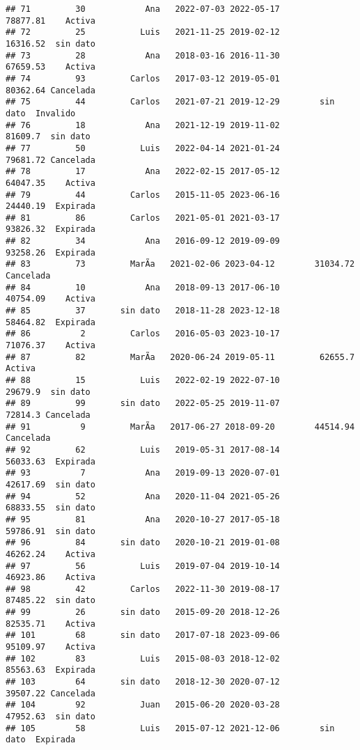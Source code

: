 \documentclass[
]{article}
\begin{document}
\begin{verbatim}
## 71         30            Ana   2022-07-03 2022-05-17        78877.81    Activa
## 72         25           Luis   2021-11-25 2019-02-12        16316.52  sin dato
## 73         28            Ana   2018-03-16 2016-11-30        67659.53    Activa
## 74         93         Carlos   2017-03-12 2019-05-01        80362.64 Cancelada
## 75         44         Carlos   2021-07-21 2019-12-29        sin dato  Invalido
## 76         18            Ana   2021-12-19 2019-11-02         81609.7  sin dato
## 77         50           Luis   2022-04-14 2021-01-24        79681.72 Cancelada
## 78         17            Ana   2022-02-15 2017-05-12        64047.35    Activa
## 79         44         Carlos   2015-11-05 2023-06-16        24440.19  Expirada
## 81         86         Carlos   2021-05-01 2021-03-17        93826.32  Expirada
## 82         34            Ana   2016-09-12 2019-09-09        93258.26  Expirada
## 83         73         MarÃ­a   2021-02-06 2023-04-12        31034.72 Cancelada
## 84         10            Ana   2018-09-13 2017-06-10        40754.09    Activa
## 85         37       sin dato   2018-11-28 2023-12-18        58464.82  Expirada
## 86          2         Carlos   2016-05-03 2023-10-17        71076.37    Activa
## 87         82         MarÃ­a   2020-06-24 2019-05-11         62655.7    Activa
## 88         15           Luis   2022-02-19 2022-07-10         29679.9  sin dato
## 89         99       sin dato   2022-05-25 2019-11-07         72814.3 Cancelada
## 91          9         MarÃ­a   2017-06-27 2018-09-20        44514.94 Cancelada
## 92         62           Luis   2019-05-31 2017-08-14        56033.63  Expirada
## 93          7            Ana   2019-09-13 2020-07-01        42617.69  sin dato
## 94         52            Ana   2020-11-04 2021-05-26        68833.55  sin dato
## 95         81            Ana   2020-10-27 2017-05-18        59786.91  sin dato
## 96         84       sin dato   2020-10-21 2019-01-08        46262.24    Activa
## 97         56           Luis   2019-07-04 2019-10-14        46923.86    Activa
## 98         42         Carlos   2022-11-30 2019-08-17        87485.22  sin dato
## 99         26       sin dato   2015-09-20 2018-12-26        82535.71    Activa
## 101        68       sin dato   2017-07-18 2023-09-06        95109.97    Activa
## 102        83           Luis   2015-08-03 2018-12-02        85563.63  Expirada
## 103        64       sin dato   2018-12-30 2020-07-12        39507.22 Cancelada
## 104        92           Juan   2015-06-20 2020-03-28        47952.63  sin dato
## 105        58           Luis   2015-07-12 2021-12-06        sin dato  Expirada

\end{verbatim}
\end{document}
